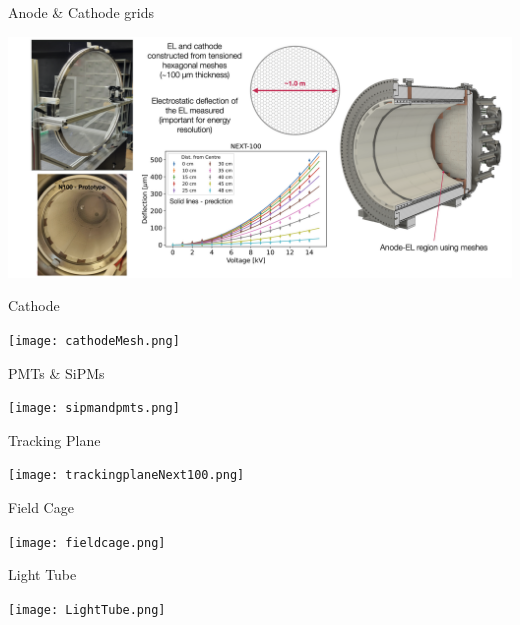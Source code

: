\documentclass [aspectratio=169]{beamer}
\begin{document}
\begin{frame}{Anode \& Cathode grids}

\includegraphics[scale=0.23]{meshes.png}

\end{frame}


\begin{frame}{Cathode}

\texttt{[image: cathodeMesh.png]}

\end{frame}


\begin{frame}{PMTs \& SiPMs}

\texttt{[image: sipmandpmts.png]}

\end{frame}


\begin{frame}{Tracking Plane}

\texttt{[image: trackingplaneNext100.png]}

\end{frame}

\begin{frame}{Field Cage}

\texttt{[image: fieldcage.png]}

\end{frame}


\begin{frame}{Light Tube}

\texttt{[image: LightTube.png]}

\end{frame}

\end{document}
